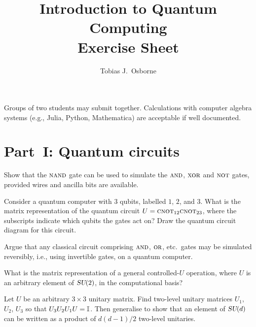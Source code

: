 \documentclass[12pt,oneside]{amsart}
\title[Introduction to Quantum Computing --- Exercises]{Introduction to Quantum Computing\\[0.5em]
{\large Exercise Sheet}}
\author{Tobias J.\ Osborne}
\date{}
\begin{document}
\maketitle

\noindent
Groups of two students may submit together. Calculations with computer
algebra systems (e.g., Julia, Python, Mathematica) are acceptable if well
documented.

\bigskip

\section*{Part~I: Quantum circuits}
\setcounter{section}{1}
\setcounter{exercise}{0}

\begin{exercise}\label{ex:nand}
  Show that the $\textsc{nand}$ gate can be used to simulate the $\textsc{and}$, $\textsc{xor}$ and
  $\textsc{not}$ gates, provided wires and ancilla bits are available.
\end{exercise}

\begin{exercise}\label{ex:cnot-circuit}
  Consider a quantum computer with $3$ qubits, labelled $1$, $2$, and $3$.
  What is the matrix representation of the quantum circuit
  $U = \textsc{cnot}_{12}\textsc{cnot}_{23}$, where the subscripts indicate which qubits
  the gates act on?  Draw the quantum circuit diagram for this circuit.
\end{exercise}

\begin{exercise}\label{ex:reversible}
  Argue that any classical circuit comprising $\textsc{and}$, $\textsc{or}$, etc.\ gates may
  be simulated reversibly, i.e., using invertible gates, on a quantum
  computer.
\end{exercise}

\begin{exercise}\label{ex:controlled-u}
  What is the matrix representation of a general controlled-$U$ operation,
  where $U$ is an arbitrary element of $\textsl{SU}(2)$, in the computational basis?
\end{exercise}

\begin{exercise}\label{ex:two-level}
  Let $U$ be an arbitrary $3\times 3$ unitary matrix.  Find two-level
  unitary matrices $U_1$, $U_2$, $U_3$ so that $U_3 U_2 U_1 U = \mathbb{I}$.
  Then generalise to show that an element of $\textsl{SU}(d)$ can be written as a
  product of $d(d-1)/2$ two-level unitaries.
\end{exercise}
\end{document}
